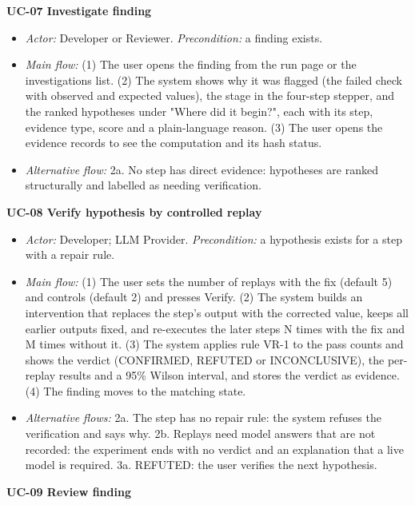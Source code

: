 \textbf{UC-07 Investigate finding}

\begin{itemize}
\item \textit{Actor:} Developer or Reviewer. \textit{Precondition:} a finding exists.
\item \textit{Main flow:} (1) The user opens the finding from the run page or the investigations list. (2) The system shows why it was flagged (the failed check with observed and expected values), the stage in the four-step stepper, and the ranked hypotheses under "Where did it begin?", each with its step, evidence type, score and a plain-language reason. (3) The user opens the evidence records to see the computation and its hash status.
\item \textit{Alternative flow:} 2a. No step has direct evidence: hypotheses are ranked structurally and labelled as needing verification.
\end{itemize}

\textbf{UC-08 Verify hypothesis by controlled replay}

\begin{itemize}
\item \textit{Actor:} Developer; LLM Provider. \textit{Precondition:} a hypothesis exists for a step with a repair rule.
\item \textit{Main flow:} (1) The user sets the number of replays with the fix (default 5) and controls (default 2) and presses Verify. (2) The system builds an intervention that replaces the step's output with the corrected value, keeps all earlier outputs fixed, and re-executes the later steps N times with the fix and M times without it. (3) The system applies rule VR-1 to the pass counts and shows the verdict (CONFIRMED, REFUTED or INCONCLUSIVE), the per-replay results and a 95\% Wilson interval, and stores the verdict as evidence. (4) The finding moves to the matching state.
\item \textit{Alternative flows:} 2a. The step has no repair rule: the system refuses the verification and says why. 2b. Replays need model answers that are not recorded: the experiment ends with no verdict and an explanation that a live model is required. 3a. REFUTED: the user verifies the next hypothesis.
\end{itemize}

\textbf{UC-09 Review finding}

